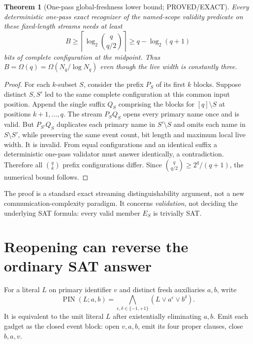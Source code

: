 \documentclass[11pt]{article}
\newtheorem{theorem}{Theorem}
\begin{document}
\begin{theorem}[One-pass global-freshness lower bound; PROVED/EXACT]
Every deterministic one-pass exact recognizer of the named-scope
validity predicate on these fixed-length streams needs at least
\[
\boxed{
B\ge\left\lceil\log_2\binom{q}{q/2}\right\rceil
\ge q-\log_2(q+1)
}
\]
bits of complete configuration at the midpoint.
Thus $B=\Omega(q)=\Omega(N_q/\log N_q)$ even though
the live width is constantly three.
\end{theorem}
\begin{proof}
For each $k$-subset $S$, consider the prefix $P_S$ of its first
$k$ blocks. Suppose distinct $S,S'$ led to the same complete
configuration at this common input position. Append the single
suffix $Q_S$ comprising the blocks for $[q]\setminus S$ at positions
$k+1,\dots,q$. The stream $P_SQ_S$ opens every primary name once and is
valid. But $P_{S'}Q_S$ duplicates each primary name in
$S'\setminus S$ and omits each name in $S\setminus S'$, while preserving
the same event count, bit length and maximum local live width.
It is invalid. From equal configurations and an identical suffix a
deterministic one-pass validator must answer identically, a
contradiction. Therefore all $\binom qk$ prefix configurations differ.
Since $\binom q{q/2}\ge2^q/(q+1)$, the numerical bound follows.
\end{proof}

The proof is a standard exact streaming distinguishability argument,
not a new communication-complexity paradigm. It concerns
\emph{validation}, not deciding the underlying SAT formula:
every valid member $E_S$ is trivially SAT.

\section{Reopening can reverse the ordinary SAT answer}
For a literal $L$ on primary identifier $v$ and distinct fresh
auxiliaries $a,b$, write
\[
\operatorname{PIN}(L;a,b)=
\bigwedge_{\epsilon,\delta\in\{-1,+1\}}
(L\vee a^\epsilon\vee b^\delta).
\]
It is equivalent to the unit literal $L$ after existentially
eliminating $a,b$. Emit each gadget as the closed event block:
open $v,a,b$, emit its four proper clauses, close $b,a,v$.
\end{document}
